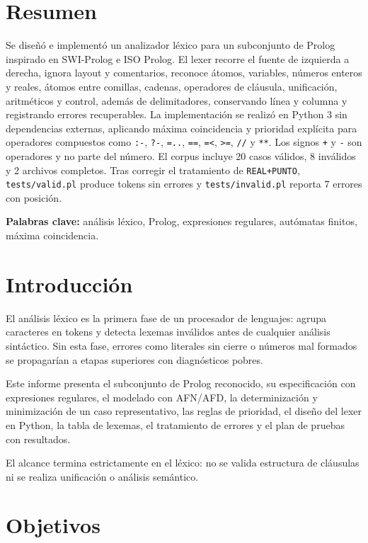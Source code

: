 \documentclass[12pt,a4paper]{article}
\begin{document}
\section*{Resumen}
Se diseñó e implementó un analizador léxico para un subconjunto de Prolog inspirado en SWI-Prolog e ISO Prolog. El lexer recorre el fuente de izquierda a derecha, ignora layout y comentarios, reconoce átomos, variables, números enteros y reales, átomos entre comillas, cadenas, operadores de cláusula, unificación, aritméticos y control, además de delimitadores, conservando línea y columna y registrando errores recuperables. La implementación se realizó en Python 3 sin dependencias externas, aplicando máxima coincidencia y prioridad explícita para operadores compuestos como \texttt{:-}, \texttt{?-}, \texttt{=..}, \texttt{==}, \texttt{=<}, \texttt{>=}, \texttt{//} y \texttt{**}. Los signos \texttt{+} y \texttt{-} son operadores y no parte del número. El corpus incluye 20 casos válidos, 8 inválidos y 2 archivos completos. Tras corregir el tratamiento de \texttt{REAL+PUNTO}, \texttt{tests/valid.pl} produce tokens sin errores y \texttt{tests/invalid.pl} reporta 7 errores con posición.

\noindent\textbf{Palabras clave:} análisis léxico, Prolog, expresiones regulares, autómatas finitos, máxima coincidencia.

\section{Introducción}
El análisis léxico es la primera fase de un procesador de lenguajes: agrupa caracteres en tokens y detecta lexemas inválidos antes de cualquier análisis sintáctico. Sin esta fase, errores como literales sin cierre o números mal formados se propagarían a etapas superiores con diagnósticos pobres.

Este informe presenta el subconjunto de Prolog reconocido, su especificación con expresiones regulares, el modelado con AFN/AFD, la determinización y minimización de un caso representativo, las reglas de prioridad, el diseño del lexer en Python, la tabla de lexemas, el tratamiento de errores y el plan de pruebas con resultados.

El alcance termina estrictamente en el léxico: no se valida estructura de cláusulas ni se realiza unificación o análisis semántico.

\section{Objetivos}
\end{document}
